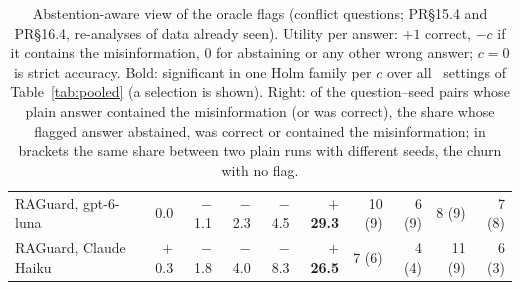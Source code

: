 \begin{table}[t]
{\begin{tabular}{lrrrrrrrrr}
RAGuard, gpt-6-luna & 0.0 & $-$1.1 & $-$2.3 & $-$4.5 & \textbf{$+$29.3} & 10 (9) & 6 (9) & 8 (9) & 7 (8) \\
RAGuard, Claude Haiku & $+$0.3 & $-$1.8 & $-$4.0 & $-$8.3 & \textbf{$+$26.5} & 7 (6) & 4 (4) & 11 (9) & 6 (3) \\
\bottomrule
\end{tabular}}
\caption{Abstention-aware view of the oracle flags (conflict questions; PR\S15.4 and PR\S16.4, re-analyses of data already
seen). Utility per answer: $+1$ correct, $-c$ if it contains the misinformation, 0 for abstaining or any other wrong
answer; $c=0$ is strict accuracy. Bold: significant in one Holm family per $c$ over all \nUtilSixSettings\ settings of
Table~\ref{tab:pooled} (a selection is shown). Right: of the question--seed pairs whose plain answer contained the
misinformation (or was correct), the share whose flagged answer abstained, was correct or contained the misinformation;
in brackets the same share between two plain runs with different seeds, the churn with no flag.}
\label{tab:utility}
\end{table}
